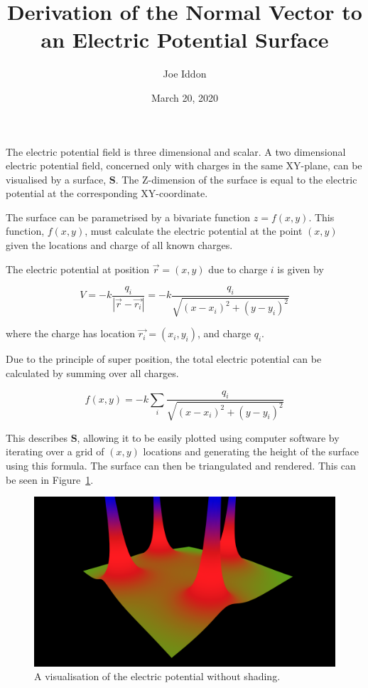 \documentclass{article} %
\begin{document}
\title{Derivation of the Normal Vector to an Electric Potential Surface}
\author{Joe Iddon}
\date{March 20, 2020}
\maketitle

The electric potential field is three dimensional and scalar. A two dimensional electric potential field, concerned only with charges in the same XY-plane, can be visualised by a surface, $\textbf{S}$. The Z-dimension of the surface is equal to the electric potential at the corresponding XY-coordinate.


The surface can be parametrised by a bivariate function $z = f(x,y)$. This function, $f(x,y)$, must calculate the electric potential at the point $(x,y)$ given the locations and charge of all known charges.

The electric potential at position $\vec{r}=(x,y)$ due to charge $i$ is given by

$$V = -k\frac{q_i}{|\vec{r}-\vec{r_i}|} = -k\frac{q_i}{\sqrt{(x-x_i)^2 + (y-y_i)^2}}$$

where the charge has location $\vec{r_i} = (x_i, y_i)$, and charge $q_i$.

Due to the principle of super position, the total electric potential can be calculated by summing over all charges.

\begin{equation}f(x,y) = -k\sum_{i}\frac{q_i}{\sqrt{(x-x_i)^2 + (y-y_i)^2}}\label{eqn:potential}\end{equation}

This describes $\textbf{S}$, allowing it to be easily plotted using computer software by iterating over a grid of $(x,y)$ locations and generating the height of the surface using this formula. The surface can then be triangulated and rendered. This can be seen in Figure~\ref{fig:no-shading}.

\begin{figure}
\includegraphics[width=\linewidth]{no_shading.png}
\caption{A visualisation of the electric potential without shading.}
\label{fig:no-shading}
\end{figure}
\end{document}
